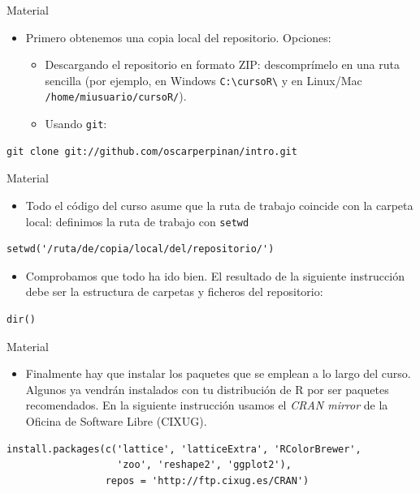 \documentclass[xcolor={usenames,svgnames,dvipsnames}]{beamer}
\begin{document}
\begin{frame}[fragile,label=sec-1-2-3]{Material}
 \begin{itemize}
\item Primero obtenemos una copia local del repositorio. Opciones:

\begin{itemize}
\item Descargando el repositorio en formato ZIP: descomprímelo en una ruta sencilla (por ejemplo, en Windows \texttt{C:\textbackslash{}cursoR\textbackslash{}} y en Linux/Mac \texttt{/home/miusuario/cursoR/}).

\item Usando \texttt{git}:
\end{itemize}
\end{itemize}
\lstset{language=sh,label= ,caption= ,numbers=none}
\begin{lstlisting}
git clone git://github.com/oscarperpinan/intro.git
\end{lstlisting}
\end{frame}

\begin{frame}[fragile,label=sec-1-2-4]{Material}
 \begin{itemize}
\item Todo el código del curso asume que la ruta de trabajo coincide con la carpeta local: definimos la ruta de trabajo con \texttt{setwd}
\end{itemize}
\lstset{language=R,label= ,caption= ,numbers=none}
\begin{lstlisting}
setwd('/ruta/de/copia/local/del/repositorio/')
\end{lstlisting}

\begin{itemize}
\item Comprobamos que todo ha ido bien. El resultado de la siguiente instrucción debe ser la estructura de carpetas y ficheros del repositorio:
\end{itemize}
\lstset{language=R,label= ,caption= ,numbers=none}
\begin{lstlisting}
dir()
\end{lstlisting}
\end{frame}

\begin{frame}[fragile,label=sec-1-2-5]{Material}
 \begin{itemize}
\item Finalmente hay que instalar los paquetes que se emplean a lo largo del curso. Algunos ya vendrán instalados con tu distribución de R por ser paquetes recomendados. En la siguiente instrucción usamos el \emph{CRAN mirror} de la Oficina de Software Libre (CIXUG).
\end{itemize}
\lstset{language=R,label= ,caption= ,numbers=none}
\begin{lstlisting}
install.packages(c('lattice', 'latticeExtra', 'RColorBrewer',
                   'zoo', 'reshape2', 'ggplot2'),
                 repos = 'http://ftp.cixug.es/CRAN')
\end{lstlisting}
\end{frame}
\end{document}
